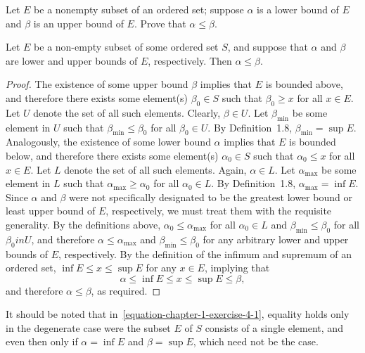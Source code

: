 \begin{exercise}
	Let $E$ be a nonempty subset of an ordered set; suppose $\alpha$ is a lower bound of $E$ and $\beta$ is an upper bound of $E$. Prove that $\alpha \leq \beta$.
\end{exercise}
\begin{proposition}
	Let $E$ be a non-empty subset of some ordered set $S$, and suppose that $\alpha$ and $\beta$ are lower and upper bounds of $E$, respectively. Then $\alpha \leq \beta$.
\end{proposition}
\begin{proof}
	The existence of some upper bound $\beta$ implies that $E$ is bounded above, and therefore there exists some element(s) $\beta_0 \in S$ such that $\beta_0 \geq x$ for all $x \in E$. Let $U$ denote the set of all such elements. Clearly, $\beta \in U$. Let $\beta_\text{min}$ be some element in $U$ such that $\beta_\text{min} \leq \beta_0$ for all $\beta_0 \in U$. By Definition~1.8, $\beta_\text{min} = \sup E$.
	\newline\newline
	Analogously, the existence of some lower bound $\alpha$ implies that $E$ is bounded below, and therefore there exists some element(s) $\alpha_0 \in S$ such that $\alpha_0 \leq x$ for all $x \in E$. Let $L$ denote the set of all such elements. Again, $\alpha \in L$. Let $\alpha_\text{max}$ be some element in $L$ such that $\alpha_\text{max} \geq \alpha_0$ for all $\alpha_0 \in L$. By Definition~1.8, $\alpha_\text{max} = \inf E$.
	\newline\newline
	Since $\alpha$ and $\beta$ were not specifically designated to be the greatest lower bound or least upper bound of $E$, respectively, we must treat them with the requisite generality. By the definitions above, $\alpha_0 \leq \alpha_\text{max}$ for all $\alpha_0 \in L$ and $\beta_\text{min} \leq \beta_0$ for all $\beta_0 in U$, and therefore $\alpha \leq \alpha_\text{max}$ and $\beta_\text{min} \leq \beta_0$ for any arbitrary lower and upper bounds of $E$, respectively.
	\newline\newline
	By the definition of the infimum and supremum of an ordered set, $\inf E \leq x \leq \sup E$ for any $x \in E$, implying that
	\begin{equation}
	\label{equation-chapter-1-exercise-4-1}
	\alpha \leq \inf E \leq x \leq \sup E \leq \beta,
	\end{equation}
	and therefore $\alpha \leq \beta$, as required.
\end{proof}
\begin{remark}
	It should be noted that in~\eqref{equation-chapter-1-exercise-4-1}, equality holds only in the degenerate case were the subset $E$ of $S$ consists of a single element, and even then only if $\alpha = \inf E$ and $\beta = \sup E$, which need not be the case.
\end{remark}
